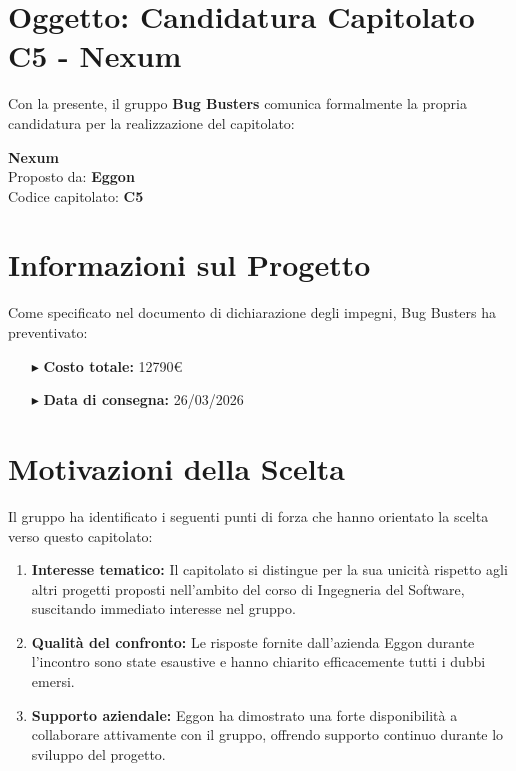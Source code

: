 \documentclass[a4paper,11pt]{article}
\begin{document}
\vspace{2em}

\section*{Oggetto: Candidatura Capitolato C5 - Nexum}

Con la presente, il gruppo \textbf{Bug Busters} comunica formalmente la propria candidatura per la realizzazione del capitolato:

\begin{center}
    {\Large\textbf{Nexum}}\\[0.3cm]
    Proposto da: \textbf{Eggon}\\
    Codice capitolato: \textbf{C5}
\end{center}

\vspace{1.5em}

\section*{Informazioni sul Progetto}

Come specificato nel documento di dichiarazione degli impegni, Bug Busters ha preventivato:

\begin{itemize}[leftmargin=2cm, itemsep=0.5em]
    \item[\textcolor{primarycolor}{$\blacktriangleright$}] \textbf{Costo totale:} 12790€
    \item[\textcolor{primarycolor}{$\blacktriangleright$}] \textbf{Data di consegna:} 26/03/2026
\end{itemize}

\vspace{1.5em}

\section*{Motivazioni della Scelta}

Il gruppo ha identificato i seguenti punti di forza che hanno orientato la scelta verso questo capitolato:

\begin{enumerate}[leftmargin=2cm, itemsep=0.8em]
    \item \textbf{Interesse tematico:} Il capitolato si distingue per la sua unicità rispetto agli altri progetti proposti nell'ambito del corso di Ingegneria del Software, suscitando immediato interesse nel gruppo.
    
    \item \textbf{Qualità del confronto:} Le risposte fornite dall'azienda Eggon durante l'incontro sono state esaustive e hanno chiarito efficacemente tutti i dubbi emersi.
    
    \item \textbf{Supporto aziendale:} Eggon ha dimostrato una forte disponibilità a collaborare attivamente con il gruppo, offrendo supporto continuo durante lo sviluppo del progetto.
\end{enumerate}
\end{document}

